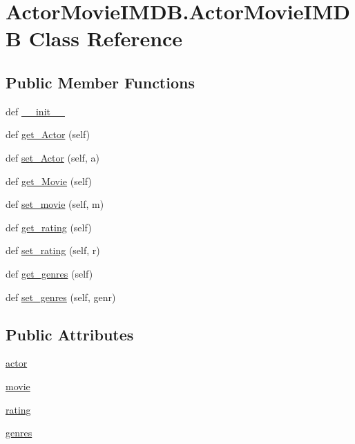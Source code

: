 \hypertarget{class_actor_movie_i_m_d_b_1_1_actor_movie_i_m_d_b}{}\section{Actor\+Movie\+I\+M\+D\+B.\+Actor\+Movie\+I\+M\+D\+B Class Reference}
\label{class_actor_movie_i_m_d_b_1_1_actor_movie_i_m_d_b}
\subsection*{Public Member Functions}
\begin{DoxyCompactItemize}
\item 
def \hyperlink{class_actor_movie_i_m_d_b_1_1_actor_movie_i_m_d_b_a3148a915d30978cec5f546c8681482fa}{\+\_\+\+\_\+init\+\_\+\+\_\+}
\item 
def \hyperlink{class_actor_movie_i_m_d_b_1_1_actor_movie_i_m_d_b_a49b66dc136cec880979c4e1db7bf9d93}{get\+\_\+\+Actor} (self)
\item 
def \hyperlink{class_actor_movie_i_m_d_b_1_1_actor_movie_i_m_d_b_a9585d6189cc06723fa6d4e8c84b05449}{set\+\_\+\+Actor} (self, a)
\item 
def \hyperlink{class_actor_movie_i_m_d_b_1_1_actor_movie_i_m_d_b_af1c05f19f5727a535d2e5cbfc8cb2b54}{get\+\_\+\+Movie} (self)
\item 
def \hyperlink{class_actor_movie_i_m_d_b_1_1_actor_movie_i_m_d_b_ac59a6e4547208882121f929dd077fda6}{set\+\_\+movie} (self, m)
\item 
def \hyperlink{class_actor_movie_i_m_d_b_1_1_actor_movie_i_m_d_b_a6ed2a111fb8a5c0cc7c2441ff81e71c0}{get\+\_\+rating} (self)
\item 
def \hyperlink{class_actor_movie_i_m_d_b_1_1_actor_movie_i_m_d_b_ab4263210370ff3e6a90d694830acb41e}{set\+\_\+rating} (self, r)
\item 
def \hyperlink{class_actor_movie_i_m_d_b_1_1_actor_movie_i_m_d_b_abb8cc15c136f36efbaab3c2f7287437e}{get\+\_\+genres} (self)
\item 
def \hyperlink{class_actor_movie_i_m_d_b_1_1_actor_movie_i_m_d_b_a5441da2cdba848710c539847818c341a}{set\+\_\+genres} (self, genr)
\end{DoxyCompactItemize}
\subsection*{Public Attributes}
\begin{DoxyCompactItemize}
\item 
\hyperlink{class_actor_movie_i_m_d_b_1_1_actor_movie_i_m_d_b_a3992574374291527d6e2ac62810e032f}{actor}
\item 
\hyperlink{class_actor_movie_i_m_d_b_1_1_actor_movie_i_m_d_b_a6bd3b1b0d77e5d64e30f693b70a82285}{movie}
\item 
\hyperlink{class_actor_movie_i_m_d_b_1_1_actor_movie_i_m_d_b_a46719008afa7ca424dd1f190d92f98d6}{rating}
\item 
\hyperlink{class_actor_movie_i_m_d_b_1_1_actor_movie_i_m_d_b_a5a53908bde8cdcd9adb7fcf600ee6d51}{genres}
\end{DoxyCompactItemize}


